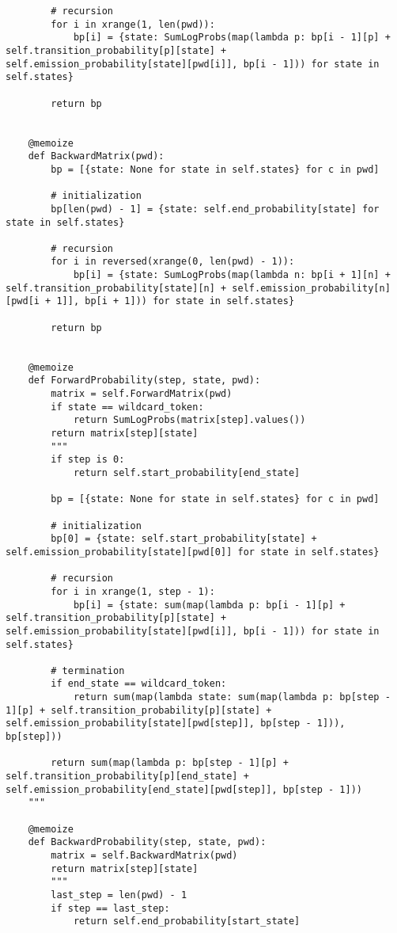 \documentclass{amsart}
\theoremstyle{definition}
\theoremstyle{remark}
\numberwithin{equation}{section}
\begin{document}
\begin{lstlisting}
        # recursion
        for i in xrange(1, len(pwd)):
            bp[i] = {state: SumLogProbs(map(lambda p: bp[i - 1][p] + self.transition_probability[p][state] + self.emission_probability[state][pwd[i]], bp[i - 1])) for state in self.states}

        return bp


    @memoize
    def BackwardMatrix(pwd):
        bp = [{state: None for state in self.states} for c in pwd]

        # initialization
        bp[len(pwd) - 1] = {state: self.end_probability[state] for state in self.states}

        # recursion
        for i in reversed(xrange(0, len(pwd) - 1)):
            bp[i] = {state: SumLogProbs(map(lambda n: bp[i + 1][n] + self.transition_probability[state][n] + self.emission_probability[n][pwd[i + 1]], bp[i + 1])) for state in self.states}

        return bp


    @memoize
    def ForwardProbability(step, state, pwd):
        matrix = self.ForwardMatrix(pwd)
        if state == wildcard_token:
            return SumLogProbs(matrix[step].values())
        return matrix[step][state]
        """
        if step is 0:
            return self.start_probability[end_state]

        bp = [{state: None for state in self.states} for c in pwd]

        # initialization
        bp[0] = {state: self.start_probability[state] + self.emission_probability[state][pwd[0]] for state in self.states}

        # recursion
        for i in xrange(1, step - 1):
            bp[i] = {state: sum(map(lambda p: bp[i - 1][p] + self.transition_probability[p][state] + self.emission_probability[state][pwd[i]], bp[i - 1])) for state in self.states}

        # termination
        if end_state == wildcard_token:
            return sum(map(lambda state: sum(map(lambda p: bp[step - 1][p] + self.transition_probability[p][state] + self.emission_probability[state][pwd[step]], bp[step - 1])), bp[step]))

        return sum(map(lambda p: bp[step - 1][p] + self.transition_probability[p][end_state] + self.emission_probability[end_state][pwd[step]], bp[step - 1]))
    """

    @memoize
    def BackwardProbability(step, state, pwd):
        matrix = self.BackwardMatrix(pwd)
        return matrix[step][state]
        """
        last_step = len(pwd) - 1
        if step == last_step:
            return self.end_probability[start_state]
        

\end{lstlisting}
\end{document}
